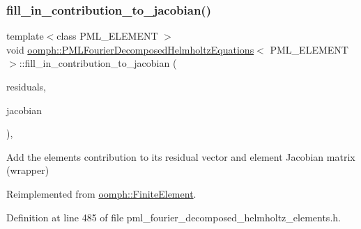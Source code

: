 \subsubsection{\texorpdfstring{fill\+\_\+in\+\_\+contribution\+\_\+to\+\_\+jacobian()}{fill\_in\_contribution\_to\_jacobian()}}
{\footnotesize\ttfamily template$<$class P\+M\+L\+\_\+\+E\+L\+E\+M\+E\+NT $>$ \\
void \hyperlink{classoomph_1_1PMLFourierDecomposedHelmholtzEquations}{oomph\+::\+P\+M\+L\+Fourier\+Decomposed\+Helmholtz\+Equations}$<$ P\+M\+L\+\_\+\+E\+L\+E\+M\+E\+NT $>$\+::fill\+\_\+in\+\_\+contribution\+\_\+to\+\_\+jacobian (\begin{DoxyParamCaption}\item[{\hyperlink{classoomph_1_1Vector}{Vector}$<$ double $>$ \&}]{residuals,  }\item[{\hyperlink{classoomph_1_1DenseMatrix}{Dense\+Matrix}$<$ double $>$ \&}]{jacobian }\end{DoxyParamCaption})\hspace{0.3cm}{\ttfamily [inline]}, {\ttfamily [virtual]}}



Add the element\textquotesingle{}s contribution to its residual vector and element Jacobian matrix (wrapper) 



Reimplemented from \hyperlink{classoomph_1_1FiniteElement_a0ae7af222af38a0d53bf283dc85bdfea}{oomph\+::\+Finite\+Element}.



Definition at line 485 of file pml\+\_\+fourier\+\_\+decomposed\+\_\+helmholtz\+\_\+elements.\+h.

\mbox{\label{classoomph_1_1PMLFourierDecomposedHelmholtzEquations_a0f9351b288c3e99e0661784899ac24d1}} 
